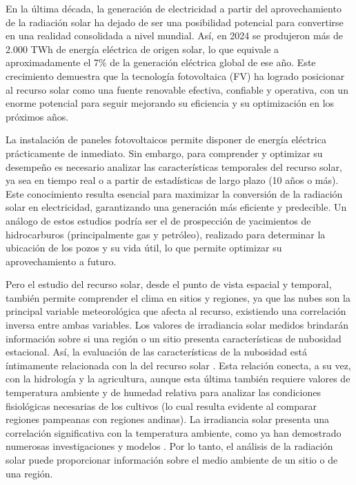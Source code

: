 \documentclass[letterpaper,12pt, twoside]{report}
\providecommand{\DIFdeltex}[1]{{\protect\color{red} \scriptsize #1}} %
\providecommand{\DIFdel}[1]{\texorpdfstring{\DIFdeltex{#1}}{}} %
\begin{document}
\DIFdel{En la última década, la generación de electricidad a partir del aprovechamiento de la radiación solar ha dejado de ser una posibilidad potencial para convertirse en una realidad consolidada a nivel mundial. Así, en 2024 se produjeron más de 2.000 TWh de energía eléctrica de origen solar, lo que equivale a aproximadamente el 7\% de la generación eléctrica global de ese año. Este crecimiento demuestra que la tecnología fotovoltaica (FV) ha logrado posicionar al recurso solar como una fuente renovable efectiva, confiable y operativa, con un enorme potencial para seguir mejorando su eficiencia y su optimización en los próximos años.
}%

\DIFdel{La instalación de paneles fotovoltaicos permite disponer de energía eléctrica prácticamente de inmediato. Sin embargo, para comprender y optimizar su desempeño es necesario analizar las características temporales del recurso solar, ya sea en tiempo real o a partir de estadísticas de largo plazo (10 años o más). Este conocimiento resulta esencial para maximizar la conversión de la radiación solar en electricidad, garantizando una generación más eficiente y predecible. Un análogo de estos estudios podría ser el de prospección de yacimientos de hidrocarburos (principalmente gas y petróleo), realizado para determinar la ubicación de los pozos y su vida útil, lo que permite optimizar su aprovechamiento a futuro.
}%

\DIFdel{Pero el estudio del recurso solar, desde el punto de vista espacial y temporal, también permite comprender el clima en sitios y regiones, ya que las nubes son la principal variable meteorológica que afecta al recurso, existiendo una correlación inversa entre ambas variables. Los valores de irradiancia solar medidos brindarán información sobre si una región o un sitio presenta características de nubosidad estacional. Así, la evaluación de las características de la nubosidad está íntimamente relacionada con la del recurso solar \citep{Stephens2005, XIE2025}. Esta relación conecta, a su vez, con la hidrología y la agricultura, aunque esta última también requiere valores de temperatura ambiente y de humedad relativa para analizar las condiciones fisiológicas necesarias de los cultivos (lo cual resulta evidente al comparar regiones pampeanas con regiones andinas). La irradiancia solar presenta una correlación significativa con la temperatura ambiente, como ya han demostrado numerosas investigaciones y modelos \cite{ QIU2022,ALMOROX2011,6477329}. Por lo tanto, el análisis de la radiación solar puede proporcionar información sobre el medio ambiente de un sitio o de una región.
}%
\end{document}
